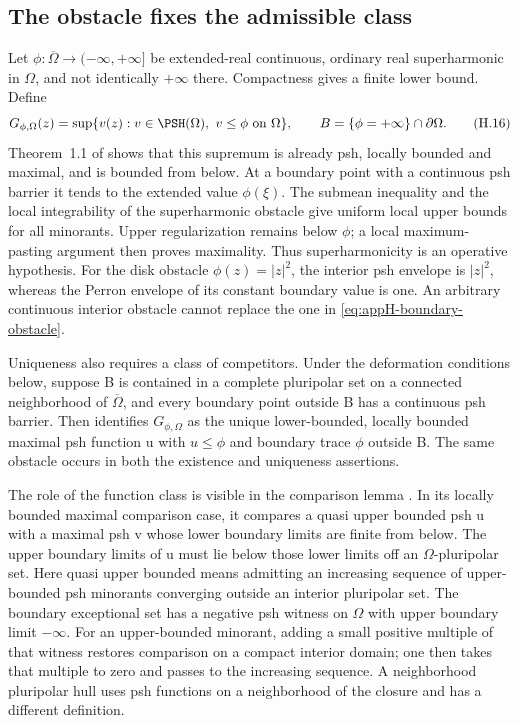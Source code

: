 \subsection{The obstacle fixes the admissible class}
\label{sec:appH-boundary-obstacle-class}

Let \(\phi:\overline\Omega\to(-\infty,+\infty]\) be extended-real
continuous, ordinary real superharmonic in \(\Omega\), and not identically
\(+\infty\) there. Compactness gives a finite lower bound. Define
\[
 G_{\phi,\Omega}(z)
   =\sup\{v(z):v\in\PSH(\Omega),\ v\leq\phi\text{ on }\Omega\},
 \qquad B=\{\phi=+\infty\}\cap\partial\Omega.
 \tag{H.16}\label{eq:appH-boundary-obstacle}
\]
Theorem~1.1 of \cite[actual pp.~14--15, proof]{DaoNguyen26UnboundedDirichletV1}
shows that this supremum is already psh, locally bounded and maximal,
and is bounded from below. At a boundary point with a continuous psh
barrier it tends to the extended value \(\phi(\xi)\).
The submean inequality and the local integrability of the superharmonic
obstacle give uniform local upper bounds for all minorants. Upper
regularization remains below \(\phi\); a local maximum-pasting argument
then proves maximality. Thus superharmonicity is an operative hypothesis.
For the disk obstacle \(\phi(z)=|z|^2\), the interior psh envelope is
\(|z|^2\), whereas the Perron envelope of its constant boundary value is
one. An arbitrary continuous interior obstacle cannot replace the one in
\eqref{eq:appH-boundary-obstacle}.

Uniqueness also requires a class of competitors. Under the deformation
conditions below, suppose B is contained in a complete pluripolar set on
a connected neighborhood of \(\overline\Omega\), and every boundary
point outside B has a continuous psh barrier. Then
\cite[Theorem~1.9; actual pp.~24--25]{DaoNguyen26UnboundedDirichletV1}
identifies \(G_{\phi,\Omega}\) as the unique lower-bounded, locally
bounded maximal psh function u with \(u\leq\phi\) and boundary trace
\(\phi\) outside B. The same obstacle occurs in both the existence and
uniqueness assertions.

The role of the function class is visible in the comparison lemma
\cite[Lemma~2.6(i), actual pp.~8--9]{DieuLongHieu25QuasiBRegularV1}.
In its locally bounded maximal comparison case, it compares a
quasi upper bounded psh u with a maximal psh v whose lower boundary
limits are finite from below. The upper boundary limits of u must lie
below those lower limits off an \(\Omega\)-pluripolar set. Here quasi
upper bounded means admitting an increasing sequence of upper-bounded
psh minorants converging outside an interior pluripolar set. The
boundary exceptional set has a negative psh witness on \(\Omega\)
with upper boundary limit \(-\infty\). For an upper-bounded minorant,
adding a small positive multiple of that witness restores comparison
on a compact interior domain; one then takes that multiple to zero
and passes to the increasing sequence. A neighborhood pluripolar hull
uses psh functions on a neighborhood of the closure and has a different
definition.

